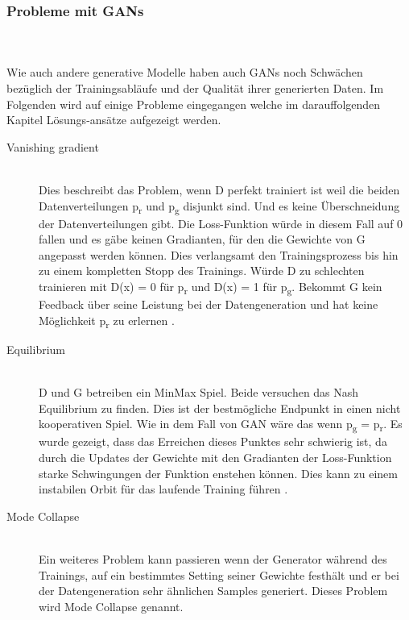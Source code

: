 \documentclass{llncs}
\begin{document}
\subsubsection{Probleme mit GANs}\label{sec:problemegan}
~\\\\
Wie auch andere generative Modelle haben auch GANs noch Schwächen bezüglich der Trainingsabläufe und der Qualität ihrer generierten Daten. Im Folgenden wird auf einige Probleme eingegangen welche im darauffolgenden Kapitel Lösungs-ansätze aufgezeigt werden. 
\\
\begin{description}	
\item[Vanishing gradient]
~\\
Dies beschreibt das Problem, wenn D perfekt trainiert ist weil die beiden Datenverteilungen p\textsubscript{r} und  p\textsubscript{g} disjunkt sind. Und es keine Überschneidung der Datenverteilungen gibt.  Die Loss-Funktion würde in diesem Fall auf 0 fallen und es gäbe keinen Gradianten, für den die Gewichte von G angepasst werden können. Dies verlangsamt den Trainingsprozess bis hin zu einem kompletten Stopp des Trainings. Würde D zu schlechten trainieren mit D(x) = 0 für p\textsubscript{r} und  D(x) = 1 für p\textsubscript{g}. Bekommt G kein Feedback über seine Leistung bei der Datengeneration und hat keine Möglichkeit p\textsubscript{r} zu erlernen \cite{vanishing}.
\\
\item[Equilibrium]
~\\
D und G betreiben ein MinMax Spiel. Beide versuchen das Nash Equilibrium zu finden. Dies ist der bestmögliche Endpunkt in einen nicht kooperativen Spiel. Wie in dem Fall von GAN wäre das wenn  p\textsubscript{g} = p\textsubscript{r}. Es wurde gezeigt, dass das Erreichen dieses Punktes sehr schwierig ist, da durch die Updates der Gewichte mit den Gradianten der Loss-Funktion starke Schwingungen der Funktion enstehen können. Dies kann zu einem instabilen Orbit für das laufende Training führen \cite{improvingan}.   
\\
\item[Mode Collapse]
~\\
Ein weiteres Problem kann passieren wenn der Generator während des Trainings, auf ein bestimmtes Setting seiner Gewichte festhält und er bei der Datengeneration sehr ähnlichen Samples generiert. Dieses Problem wird Mode Collapse genannt\cite{improvingan}.
\end{description}
\end{document}
